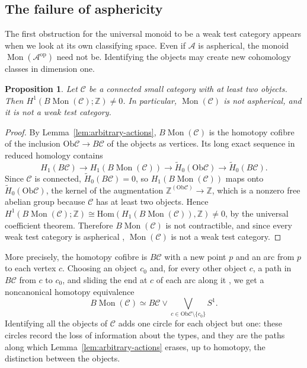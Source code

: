 \documentclass[11pt]{amsart}
\newtheorem{proposition}[teo]{Proposition}
\theoremstyle{definition}
\theoremstyle{remark}
\numberwithin{figure}{section}%
\newcommand{\CC}{\mathcal{C}}
\DeclareMathOperator{\Mon}{Mon}
\newcommand{\Ob}{\mathrm{Ob}}
\newcommand{\Hom}{\mathrm{Hom}}
\newcommand{\op}{\mathrm{op}}
\newcommand{\A}{\mathcal{A}}
\begin{document}
\subsection{The failure of asphericity}
\label{subsec:failure-asphericity}

The first obstruction for the universal monoid to be a weak test category appears when we look at its own classifying space. Even if $\A$ is aspherical, the monoid $\Mon(\A^{\op})$ need not be. Identifying the objects may create new cohomology classes in dimension one.

\begin{proposition}
\label{prop:universal-monoid-not-aspherical}
Let $\CC$ be a connected small category with at least two objects. Then $H^1(B\Mon(\CC);\mathbb Z)\neq0$. In particular, $\Mon(\CC)$ is not aspherical, and it is not a weak test category.
\end{proposition}

\begin{proof}
By Lemma~\ref{lem:arbitrary-actions}, $B\Mon(\CC)$ is the homotopy cofibre of the inclusion $\Ob\CC\to B\CC$ of the objects as vertices. Its long exact sequence in reduced homology contains
\[
H_1(B\CC)\longrightarrow H_1(B\Mon(\CC))\longrightarrow\tilde H_0(\Ob\CC)\longrightarrow\tilde H_0(B\CC).
\]
Since $\CC$ is connected, $\tilde H_0(B\CC)=0$, so $H_1(B\Mon(\CC))$ maps onto $\tilde H_0(\Ob\CC)$, the kernel of the augmentation $\mathbb Z^{(\Ob\CC)}\to\mathbb Z$, which is a nonzero free abelian group because $\CC$ has at least two objects. Hence $H^1(B\Mon(\CC);\mathbb Z)\cong\Hom(H_1(B\Mon(\CC)),\mathbb Z)\neq0$, by the universal coefficient theorem. Therefore $B\Mon(\CC)$ is not contractible, and since every weak test category is aspherical \cite[Prop.~1.3.9]{Malt}, $\Mon(\CC)$ is not a weak test category.
\end{proof}

More precisely, the homotopy cofibre is $B\CC$ with a new point $p$ and an arc from $p$ to each vertex $c$. Choosing an object $c_0$ and, for every other object $c$, a path in $B\CC$ from $c$ to $c_0$, and sliding the end at $c$ of each arc along it \cite[Prop.~0.18]{Hatcher}, we get a noncanonical homotopy equivalence
\[
B\Mon(\CC)\simeq B\CC\vee\bigvee_{c\in\Ob\CC\setminus\{c_0\}}S^1 .
\]
Identifying all the objects of $\CC$ adds one circle for each object but one: these circles record the loss of information about the types, and they are the paths along which Lemma~\ref{lem:arbitrary-actions} erases, up to homotopy, the distinction between the objects.
\end{document}

